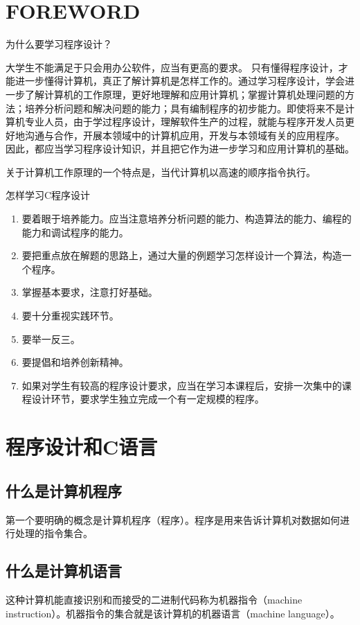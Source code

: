 \chapter{FOREWORD}
为什么要学习程序设计？

大学生不能满足于只会用办公软件，应当有更高的要求。
只有懂得程序设计，才能进一步懂得计算机，真正了解计算机是怎样工作的。通过学习程序设计，学会进一步了解计算机的工作原理，更好地理解和应用计算机；掌握计算机处理问题的方法；培养分析问题和解决问题的能力；具有编制程序的初步能力。即使将来不是计算机专业人员，由于学过程序设计，理解软件生产的过程，就能与程序开发人员更好地沟通与合作，开展本领域中的计算机应用，开发与本领域有关的应用程序。
因此，都应当学习程序设计知识，并且把它作为进一步学习和应用计算机的基础。

关于计算机工作原理的一个特点是，当代计算机以高速的顺序指令执行。

怎样学习C程序设计
\begin{enumerate}
	\item 要着眼于培养能力。应当注意培养分析问题的能力、构造算法的能力、编程的能力和调试程序的能力。
	\item 要把重点放在解题的思路上，通过大量的例题学习怎样设计一个算法，构造一个程序。
	\item 掌握基本要求，注意打好基础。
	\item 要十分重视实践环节。
	\item 要举一反三。
	\item 要提倡和培养创新精神。
	\item 如果对学生有较高的程序设计要求，应当在学习本课程后，安排一次集中的课程设计环节，要求学生独立完成一个有一定规模的程序。
\end{enumerate}

\chapter{程序设计和C语言}

\section{什么是计算机程序}

第一个要明确的概念是计算机程序（程序）。程序是用来告诉计算机对数据如何进行处理的指令集合。

\section{什么是计算机语言}

这种计算机能直接识别和而接受的二进制代码称为机器指令（machine instruction）。机器指令的集合就是该计算机的机器语言（machine language）。


